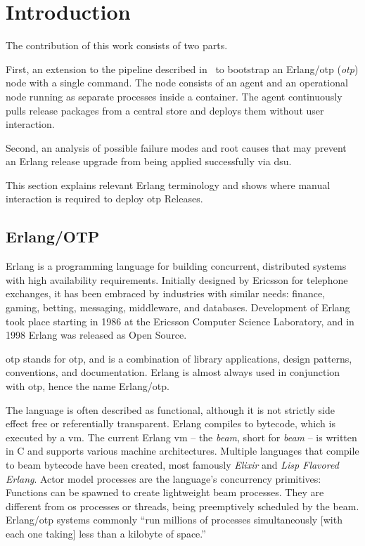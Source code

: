 \section{Introduction}

The contribution of this work consists of two parts. \begin{enumerate*}[label=(\roman*)]
  \item First, an extension to the pipeline described in~\cite{zak18} to bootstrap an Erlang/\acrshort{otp} (\emph{\acrlong{otp}}) node with a single command. The node consists of an agent and an operational node running as separate processes inside a container. The agent continuously pulls release packages from a central store and deploys them without user interaction.
  \item Second, an analysis of possible failure modes and root causes that may prevent an Erlang release upgrade from being applied successfully via \acrfull{dsu}.
\end{enumerate*}

This section explains relevant Erlang terminology and shows where manual interaction is required to deploy \acrshort{otp} Releases.

\subsection{Erlang/OTP}

Erlang is a programming language for building concurrent, distributed systems with high availability requirements. Initially designed by Ericsson for telephone exchanges, it has been embraced by industries with similar needs: finance, gaming, betting, messaging, middleware, and databases. Development of Erlang took place starting in 1986 at the Ericsson Computer Science Laboratory, and in 1998 Erlang was released as Open Source.~\cite{armstrong2007history}

\acrshort{otp} stands for \acrlong{otp}, and is a combination of library applications, design patterns, conventions, and documentation. Erlang is almost always used in conjunction with \acrshort{otp}, hence the name Erlang/\acrshort{otp}.~\cite{ferd}

The language is often described as functional, although it is not strictly side effect free or referentially transparent. Erlang compiles to bytecode, which is executed by a \acrfull{vm}. The current Erlang \acrshort{vm} – the \emph{\acrshort{beam}}, short for \emph{\acrlong{beam}} – is written in C and supports various machine architectures. Multiple languages that compile to \acrshort{beam} bytecode have been created, most famously \emph{Elixir} and \emph{Lisp Flavored Erlang}. Actor model processes are the language's concurrency primitives: Functions can be spawned to create lightweight \acrshort{beam} processes. They are different from \acrfull{os} processes or threads, being preemptively scheduled by the \acrshort{beam}. Erlang/\acrshort{otp} systems commonly ``run millions of processes simultaneously [with each one taking] less than a kilobyte of space.''~\cite{larson}

